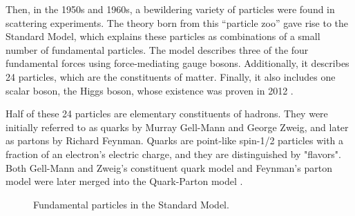 Then, in the 1950s and 1960s, a bewildering variety of particles were found in scattering experiments.
The theory born from this ``particle zoo'' gave rise to the Standard Model, which explains these particles as combinations of a small number of fundamental particles.
The model describes three of the four fundamental forces using force-mediating gauge bosons.
Additionally, it describes 24 particles, which are the constituents of matter.
Finally, it also includes one scalar boson, the Higgs boson, whose existence was proven in 2012 \cite{aad2012}.

Half of these 24 particles are elementary constituents of hadrons.
They were initially referred to as quarks by Murray Gell-Mann and George Zweig, and later as partons by Richard Feynman.
Quarks are point-like spin-1/2 particles with a fraction of an electron's electric charge, and they are distinguished by "flavors".
Both Gell-Mann and Zweig's constituent quark model and Feynman's parton model were later merged into the Quark-Parton model \cite{perkins2000}.

\begin{figure}[t!]
    \caption[The standard model.]
    {Fundamental particles in the Standard Model.}
    \label{fig::10.02::standard_model}
\end{figure}
